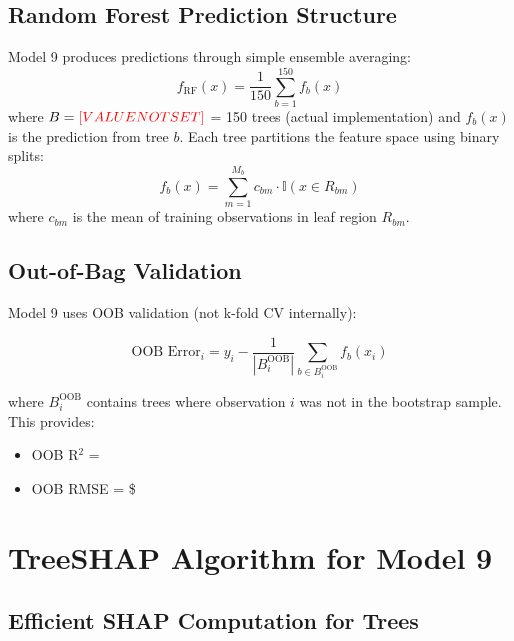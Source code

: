 \subsection{Random Forest Prediction Structure}
Model 9 produces predictions through simple ensemble averaging:
%
\begin{equation}
f_{\text{RF}}(x) = \frac{1}{150} \sum_{b=1}^{150} f_b(x)
\label{eq:rf_prediction}
\end{equation}
%
where $B = \textcolor{red}{[VALUE NOT SET]}{}$ = 150 trees (actual implementation) and $f_b(x)$ is the prediction from tree $b$. Each tree partitions the feature space using binary splits:
%
\begin{equation}
f_b(x) = \sum_{m=1}^{M_b} c_{bm} \cdot \mathbb{I}(x \in R_{bm})
\label{eq:tree_structure}
\end{equation}
%
where $c_{bm}$ is the mean of training observations in leaf region $R_{bm}$.

\subsection{Out-of-Bag Validation}

Model 9 uses OOB validation (not k-fold CV internally):

\begin{equation}
\text{OOB Error}_i = y_i - \frac{1}{|B_i^{\text{OOB}}|} \sum_{b \in B_i^{\text{OOB}}} f_b(x_i)
\label{eq:oob_error}
\end{equation}

where $B_i^{\text{OOB}}$ contains trees where observation $i$ was not in the bootstrap sample. This provides:
\begin{itemize}
    \item OOB R$^2$ = \ModelNineOOBRSquared{}
    \item OOB RMSE = \$\ModelNineOOBError{}
\end{itemize}

\section{TreeSHAP Algorithm for Model 9}

\subsection{Efficient SHAP Computation for Trees}

